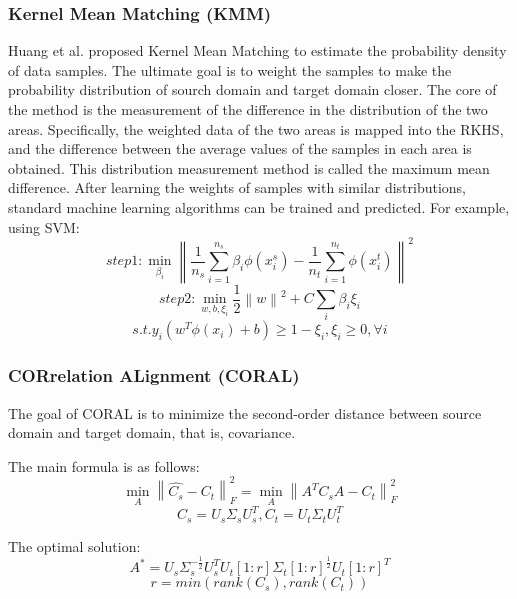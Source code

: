 \documentclass[conference]{IEEEtran}
\begin{document}
\subsubsection{Kernel Mean Matching (KMM)}
Huang et al. proposed Kernel Mean Matching\cite{gretton2009covariate} to estimate the probability density of data samples. The ultimate goal is to weight the samples to make the probability distribution of sourch domain and target domain closer. The core of the method is the measurement of the difference in the distribution of the two areas. Specifically, the weighted data of the two areas is mapped into the RKHS, and the difference between the average values of the samples in each area is obtained. This distribution measurement method is called the maximum mean difference. After learning the weights of samples with similar distributions, standard machine learning algorithms can be trained and predicted. For example, using SVM:
\begin{equation}
step1: \min\limits_{\beta_i}\left\|\frac{1}{n_s}\sum_{i=1}^{n_s}\beta_{i}\phi(x_i^s)-\frac{1}{n_t}\sum_{i=1}^{n_t}\phi(x_i^t)\right\|^2
\end{equation}
\begin{equation}
step2: \min\limits_{w,b,\xi_i}\frac{1}{2}\left\|w\right\|^2+C\sum_i\beta_i\xi_i
\end{equation}
\begin{equation}
s.t. y_i(w^T\phi(x_i)+b)\ge 1-\xi_i, \xi_i\ge 0, \forall i
\end{equation}
\subsubsection{CORrelation ALignment (CORAL)}
The goal of CORAL is to minimize the second-order distance between source domain and target domain, that is, covariance. \par
The main formula is as follows:
\begin{equation}
\min_A\left\|\widehat{C_s}-C_t\right\|^2_F=\min_A\left\|A^TC_sA-C_t\right\|^2_F
\end{equation}
\begin{equation}
C_s = U_s\Sigma_sU_s^T,C_t = U_t\Sigma_tU_t^T
\end{equation}\par
The optimal solution:
\begin{equation} A^*=U_s\Sigma_s^{-\frac{1}{2}}U_s^TU_t[1:r]\Sigma_t[1:r]^{\frac{1}{2}}U_t[1:r]^T
\end{equation}
\begin{equation}
r = min(rank(C_s),rank(C_t))
\end{equation}
\end{document}
